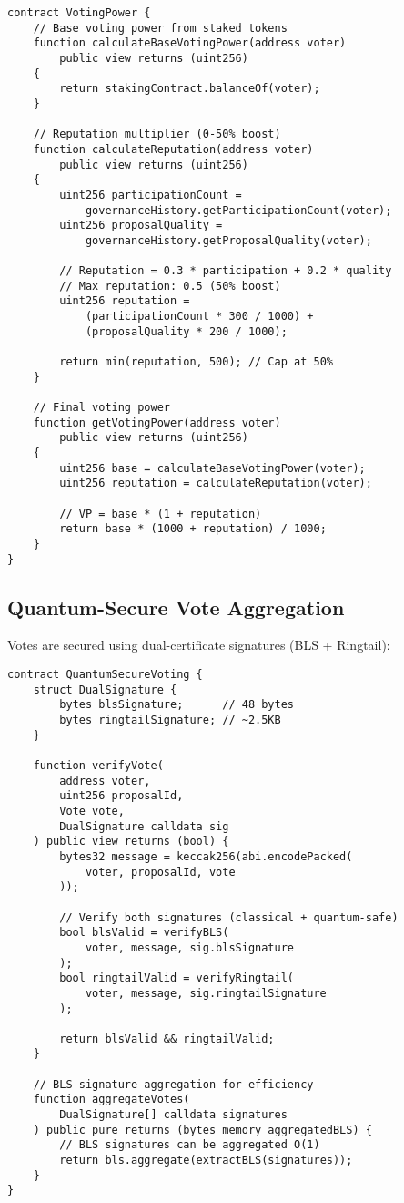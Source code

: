 \documentclass[11pt,a4paper]{article}
\begin{document}
\begin{lstlisting}[language=Solidity,caption=Voting power calculation with reputation]
contract VotingPower {
    // Base voting power from staked tokens
    function calculateBaseVotingPower(address voter)
        public view returns (uint256)
    {
        return stakingContract.balanceOf(voter);
    }

    // Reputation multiplier (0-50% boost)
    function calculateReputation(address voter)
        public view returns (uint256)
    {
        uint256 participationCount =
            governanceHistory.getParticipationCount(voter);
        uint256 proposalQuality =
            governanceHistory.getProposalQuality(voter);

        // Reputation = 0.3 * participation + 0.2 * quality
        // Max reputation: 0.5 (50% boost)
        uint256 reputation =
            (participationCount * 300 / 1000) +
            (proposalQuality * 200 / 1000);

        return min(reputation, 500); // Cap at 50%
    }

    // Final voting power
    function getVotingPower(address voter)
        public view returns (uint256)
    {
        uint256 base = calculateBaseVotingPower(voter);
        uint256 reputation = calculateReputation(voter);

        // VP = base * (1 + reputation)
        return base * (1000 + reputation) / 1000;
    }
}
\end{lstlisting}

\subsection{Quantum-Secure Vote Aggregation}

Votes are secured using dual-certificate signatures (BLS + Ringtail):

\begin{lstlisting}[language=Solidity,caption=Quantum-secure vote verification]
contract QuantumSecureVoting {
    struct DualSignature {
        bytes blsSignature;      // 48 bytes
        bytes ringtailSignature; // ~2.5KB
    }

    function verifyVote(
        address voter,
        uint256 proposalId,
        Vote vote,
        DualSignature calldata sig
    ) public view returns (bool) {
        bytes32 message = keccak256(abi.encodePacked(
            voter, proposalId, vote
        ));

        // Verify both signatures (classical + quantum-safe)
        bool blsValid = verifyBLS(
            voter, message, sig.blsSignature
        );
        bool ringtailValid = verifyRingtail(
            voter, message, sig.ringtailSignature
        );

        return blsValid && ringtailValid;
    }

    // BLS signature aggregation for efficiency
    function aggregateVotes(
        DualSignature[] calldata signatures
    ) public pure returns (bytes memory aggregatedBLS) {
        // BLS signatures can be aggregated O(1)
        return bls.aggregate(extractBLS(signatures));
    }
}
\end{lstlisting}
\end{document}
